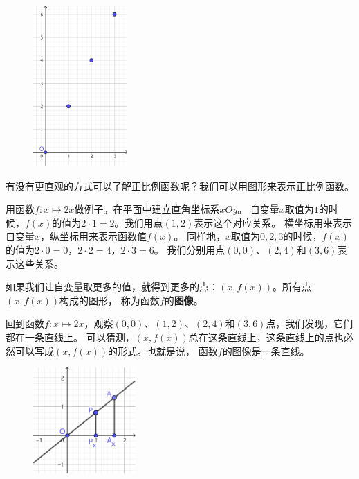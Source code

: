 \documentclass[12pt,UTF8]{ctexbook}
\begin{document}
\begin{figure} %
    \vspace{-10pt}
    \flushright
    \includegraphics[width=0.32\textwidth]{正比例0.png}
\end{figure}

有没有更直观的方式可以了解正比例函数呢？我们可以用图形来表示正比例函数。

用函数$f: x \mapsto 2x$做例子。在平面中建立直角坐标系$xOy$。
自变量$x$取值为$1$的时候，$f(x)$的值为$2\cdot 1 = 2$。我们用点$(1, 2)$表示这个对应关系。
横坐标用来表示自变量$x$，纵坐标用来表示函数值$f(x)$。
同样地，$x$取值为$0,2,3$的时候，$f(x)$的值为$2\cdot 0 = 0$，$2\cdot 2 = 4$，$2\cdot 3 = 6$。
我们分别用点$(0,0)$、$(2,4)$和$(3,6)$表示这些关系。

如果我们让自变量取更多的值，就得到更多的点：$(x, f(x))$。所有点$(x, f(x))$构成的图形，
称为函数$f$的\textbf{图像}。

回到函数$f: x \mapsto 2x$，观察$(0, 0)$、$(1, 2)$、$(2,4)$和$(3,6)$点，我们发现，它们都在一条直线上。
可以猜测，$(x, f(x))$总在这条直线上，这条直线上的点也必然可以写成$(x, f(x))$的形式。也就是说，
函数$f$的图像是一条直线。

\begin{figure} %
    \vspace{-10pt}
    \flushright
    \includegraphics[width=0.35\textwidth]{正比例1.png}
\end{figure}
\end{document}
